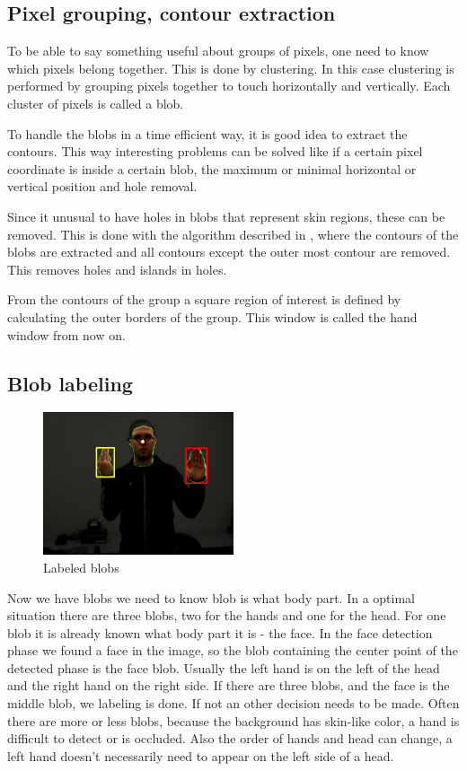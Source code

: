 \subsection*{Pixel grouping, contour extraction}
To be able to say something useful about groups of pixels, one need to know which pixels belong together. This is done by clustering. In this case clustering is performed by grouping pixels together to touch horizontally and vertically. Each cluster of pixels is called a blob.

To handle the blobs in a time efficient way, it is good idea to extract the contours. This way interesting problems can be solved like if a certain pixel coordinate is inside a certain blob, the maximum or minimal horizontal or vertical position and hole removal.

Since it unusual to have holes in blobs that represent skin regions, these can be removed. This is done with the algorithm described in \cite{Suzuki1985}, where the contours of the blobs are extracted and all contours except the outer most contour are removed. This removes holes and islands in holes.

From the contours of the group a square region of interest is defined by calculating the outer borders of the group. This window is called the hand window from now on.

\subsection*{Blob labeling}

\begin{figure}[htbp]
    \center{}
    \includegraphics[width=0.5\textwidth]{figures/pipeline/contours.jpg}
	\caption{Labeled blobs}
	\label{fig:contours}
\end{figure}


Now we have blobs we need to know blob is what body part. In a optimal situation there are three blobs, two for the hands and one for the head. For one blob it is already known what body part it is - the face. In the face detection phase we found a face in the image, so the blob containing the center point of the detected phase is the face blob. Usually the left hand is on the left of the head and the right hand on the right side. If there are three blobs, and the face is the middle blob, we labeling is done. If not an other decision needs to be made. Often there are more or less blobs, because the background has skin-like color, a hand is difficult to detect or is occluded. Also the order of hands and head can change, a left hand doesn't necessarily need to appear on the left side of a head.

